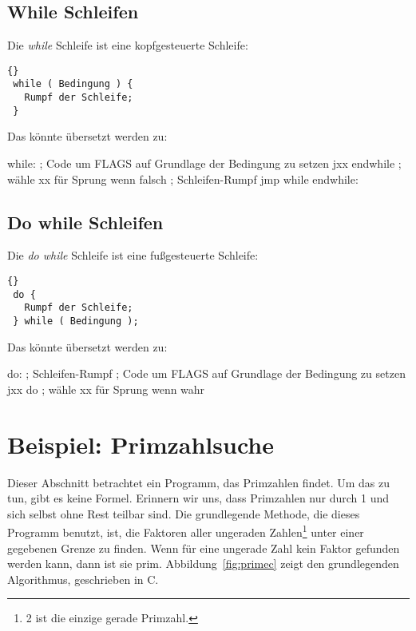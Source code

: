 \subsection{While Schleifen }
Die \emph{while} Schleife ist eine kopfgesteuerte Schleife:
\begin{lstlisting}[numbers=none]{}
 while ( Bedingung ) {
   Rumpf der Schleife;
 }
\end{lstlisting}
\noindent Das k\"{o}nnte \"{u}bersetzt werden zu:
\begin{AsmCodeListing}[frame=none, numbers=left, commandchars=\\\{\}]
 while:
      ; Code um FLAGS auf Grundlage der Bedingung zu setzen
      jxx    endwhile         ; w\"{a}hle xx f\"{u}r Sprung wenn falsch
      ; Schleifen-Rumpf
      jmp    while
 endwhile:
\end{AsmCodeListing}

\subsection{Do while Schleifen }
Die \emph{do while} Schleife ist eine fu{\ss}gesteuerte Schleife:
\begin{lstlisting}[numbers=none]{}
 do {
   Rumpf der Schleife;
 } while ( Bedingung );
\end{lstlisting}
\noindent Das k\"{o}nnte \"{u}bersetzt werden zu:
\begin{AsmCodeListing}[frame=none, numbers=left, commandchars=\\\{\}]
 do:
      ; Schleifen-Rumpf
      ; Code um FLAGS auf Grundlage der Bedingung zu setzen
      jxx    do               ; w\"{a}hle xx f\"{u}r Sprung wenn wahr
\end{AsmCodeListing}

\section{Beispiel: Primzahlsuche}
Dieser Abschnitt betrachtet ein Programm, das Primzahlen findet. Um
das zu tun, gibt es keine Formel. Erinnern wir uns, dass Primzahlen
nur durch 1 und sich selbst ohne Rest teilbar sind. Die grundlegende
Methode, die dieses Programm benutzt, ist, die Faktoren aller
ungeraden Zahlen\footnote{2 ist die einzige gerade Primzahl.} unter
einer gegebenen Grenze zu finden. Wenn f\"{u}r eine ungerade Zahl kein
Faktor gefunden werden kann, dann ist sie prim.
Abbildung~\ref{fig:primec} zeigt den grundlegenden Algorithmus,
geschrieben in C\@.

